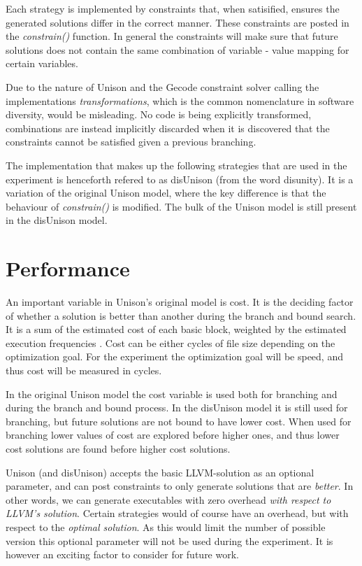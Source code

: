 Each strategy is implemented by constraints that, when satisified, ensures the
generated solutions differ in the correct manner. These constraints are posted in the
\textit{constrain()} function. In general the constraints will make sure that future
solutions does not contain the same combination of variable - value mapping for certain
variables.

Due to the nature of Unison and the Gecode constraint solver calling the implementations
\textit{transformations}, which is the common nomenclature in software diversity, would be
misleading. No code is being explicitly transformed, combinations are instead implicitly
discarded when it is discovered that the constraints cannot be satisfied given a previous
branching.

The implementation that makes up the following strategies that are used in the experiment
is henceforth refered to as disUnison (from the word disunity). It is a variation of the
original Unison model, where the key difference is that the behaviour of \textit{constrain()}
is modified. The bulk of the Unison model is still present in the disUnison model.




\section{Performance}
\label{sec:performance}

An important variable in Unison's original model is cost. It is the deciding factor of
whether a solution is better than another during the branch and bound search. It is a sum
of the estimated cost of each basic block, weighted by the estimated execution frequencies
\cite{unison-docs}. Cost can be either cycles of file size depending on the optimization
goal. For the experiment the optimization goal will be speed, and thus cost will be
measured in cycles.

In the original Unison model the cost variable is used both for branching and during the
branch and bound process. In the disUnison model it is still used for branching, but future
solutions are not bound to have lower cost. When used for branching lower values of cost
are explored before higher ones, and thus lower cost solutions are found before higher
cost solutions.

Unison (and disUnison) accepts the basic LLVM-solution as an optional parameter, and can
post constraints to only generate solutions that are \textit{better}. In other words, we
can generate executables with zero overhead \textit{with respect to LLVM's solution}.
Certain strategies would of course have an overhead, but with respect to the
\textit{optimal solution}. As this would limit the number of possible version this
optional parameter will not be used during the experiment. It is however an exciting
factor to consider for future work.

